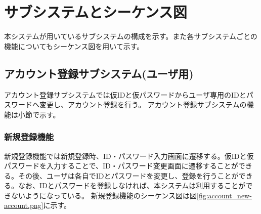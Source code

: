 \documentclass[a4j]{jarticle}
\begin{document}
  \section{サブシステムとシーケンス図}
  本システムが用いているサブシステムの構成を示す。また各サブシステムごとの機能についてもシーケンス図を用いて示す。
  \subsection{アカウント登録サブシステム(ユーザ用)}
  アカウント登録サブシステムでは仮IDと仮パスワードからユーザ専用のIDとパスワードへ変更し、アカウント登録を行う。
  アカウント登録サブシステムの機能は小節で示す。
  \subsubsection{新規登録機能}
  新規登録機能では新規登録時、ID・パスワード入力画面に遷移する。仮IDと仮パスワードを入力することで、ID・パスワード変更画面に遷移することができる。その後、ユーザは各自でIDとパスワードを変更し、登録を行うことができる。なお、IDとパスワードを登録しなければ、本システムは利用することができないようになっている。
  新規登録機能のシーケンス図は図\ref{fig:account_new-account.png}に示す。
\end{document}
